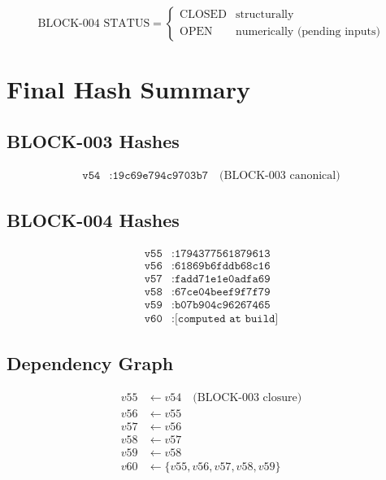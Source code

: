 \documentclass[11pt,a4paper]{article}
\theoremstyle{definition}
\begin{document}
\begin{equation}
\label{eq:status-12}
\text{BLOCK-004 STATUS} = \begin{cases}
\text{CLOSED} & \text{structurally} \\
\text{OPEN} & \text{numerically (pending inputs)}
\end{cases}
\end{equation}

\section{Final Hash Summary}
\label{app:final-hash}

\subsection{BLOCK-003 Hashes}
\label{subsec:final-b003}

\begin{align}
\label{eq:final-1}
\texttt{v54} &: \texttt{19c69e794c9703b7} \quad \text{(BLOCK-003 canonical)}
\end{align}

\subsection{BLOCK-004 Hashes}
\label{subsec:final-b004}

\begin{align}
\label{eq:final-2}
\texttt{v55} &: \texttt{1794377561879613} \\
\label{eq:final-3}
\texttt{v56} &: \texttt{61869b6fddb68c16} \\
\label{eq:final-4}
\texttt{v57} &: \texttt{fadd71e1e0adfa69} \\
\label{eq:final-5}
\texttt{v58} &: \texttt{67ce04beef9f7f79} \\
\label{eq:final-6}
\texttt{v59} &: \texttt{b07b904c96267465} \\
\label{eq:final-7}
\texttt{v60} &: \texttt{[computed at build]}
\end{align}

\subsection{Dependency Graph}
\label{subsec:final-deps}

\begin{align}
\label{eq:final-8}
v55 &\leftarrow v54 \quad \text{(BLOCK-003 closure)} \\
\label{eq:final-9}
v56 &\leftarrow v55 \\
\label{eq:final-10}
v57 &\leftarrow v56 \\
\label{eq:final-11}
v58 &\leftarrow v57 \\
\label{eq:final-12}
v59 &\leftarrow v58 \\
\label{eq:final-13}
v60 &\leftarrow \{v55, v56, v57, v58, v59\}
\end{align}
\end{document}
